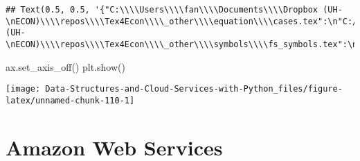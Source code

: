 \documentclass[
]{book}
\newenvironment{Shaded}{\begin{snugshade}}{\end{snugshade}}
\newcommand{\NormalTok}[1]{#1}
\begin{document}
\begin{verbatim}
## Text(0.5, 0.5, '{"C:\\\\Users\\\\fan\\\\Documents\\\\Dropbox (UH-\nECON)\\\\repos\\\\Tex4Econ\\\\_other\\\\equation\\\\cases.tex":\n"C:/Users/fan/Documents/cases.pdf",\n"C:\\\\Users\\\\fan\\\\Documents\\\\Dropbox (UH-\nECON)\\\\repos\\\\Tex4Econ\\\\_other\\\\symbols\\\\fs_symbols.tex":\n"C:/Users/fan/Documents/fs_symbols.pdf"}')
\end{verbatim}

\begin{Shaded}
\begin{Highlighting}[]
\NormalTok{ax.set\_axis\_off()}
\NormalTok{plt.show()}
\end{Highlighting}
\end{Shaded}

\begin{center}\texttt{[image: Data-Structures-and-Cloud-Services-with-Python\_files/figure-latex/unnamed-chunk-110-1]} \end{center}

\hypertarget{amazon-web-services}{%
\chapter{Amazon Web Services}\label{amazon-web-services}}
\end{document}
